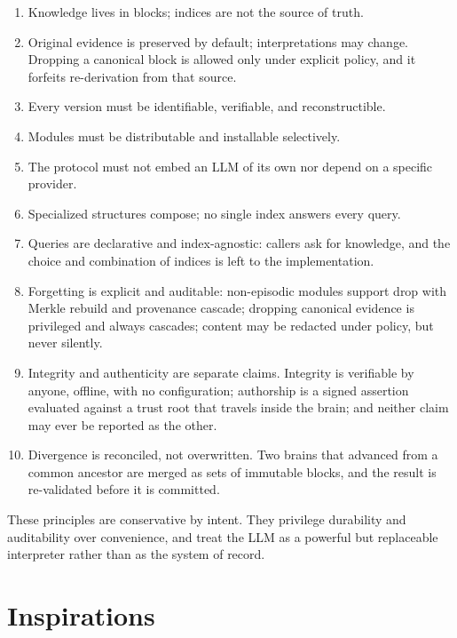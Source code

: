 \documentclass[11pt,a4paper]{article}
\begin{document}
\begin{enumerate}[leftmargin=1.6em]
  \item Knowledge lives in blocks; indices are not the source of truth.
  \item Original evidence is preserved by default; interpretations may change.
  Dropping a canonical block is allowed only under explicit policy, and it
  forfeits re-derivation from that source.
  \item Every version must be identifiable, verifiable, and reconstructible.
  \item Modules must be distributable and installable selectively.
  \item The protocol must not embed an LLM of its own nor depend on a specific
  provider.
  \item Specialized structures compose; no single index answers every query.
  \item Queries are declarative and index-agnostic: callers ask for knowledge,
and the choice and combination of indices is left to the implementation.
  \item Forgetting is explicit and auditable: non-episodic modules support drop
  with Merkle rebuild and provenance cascade; dropping canonical evidence is
  privileged and always cascades; content may be redacted under policy, but
  never silently.
  \item Integrity and authenticity are separate claims. Integrity is verifiable
  by anyone, offline, with no configuration; authorship is a signed assertion
  evaluated against a trust root that travels inside the brain; and neither claim
  may ever be reported as the other.
  \item Divergence is reconciled, not overwritten. Two brains that advanced from
  a common ancestor are merged as sets of immutable blocks, and the result is
  re-validated before it is committed.
\end{enumerate}

These principles are conservative by intent. They privilege durability and
auditability over convenience, and treat the LLM as a powerful but replaceable
interpreter rather than as the system of record.

\section{Inspirations}
\label{sec:inspiration}
\end{document}
